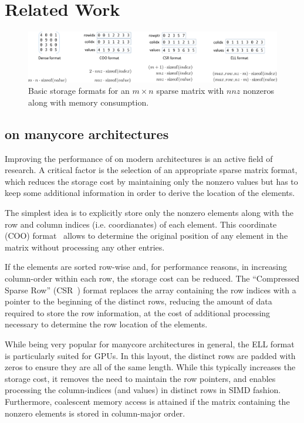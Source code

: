 \section{Related Work}
\label{2017-batched-spmv:sec:related}


\begin{figure}
\centering
\includegraphics[width=\columnwidth]{plots/formats}
\caption{Basic storage formats for an $m\times n$ sparse matrix with $nnz$
    nonzeros along with memory consumption.}
\label{2017-batched-spmv:fig:formatoverview}
\end{figure}

\subsection{\spmv on manycore architectures}

Improving the performance of \spmv on modern architectures is an active field of research. 
A critical factor is the selection of an appropriate
sparse matrix format, which reduces the storage cost by maintaining only the nonzero values
but has to keep some additional information in order to derive the location of the elements.

The simplest idea is to explicitly store only the nonzero elements
along with the row and column indices (i.e. coordianates) of each element.
This coordinate (COO)
format~\cite{barrettemplates} allows to determine the original position of any element
in the matrix without processing any other entries.

If the elements are sorted row-wise and, for performance reasons,
in increasing column-order within each row,
the storage cost can be reduced.
The ``Compressed Sparse Row'' (CSR~\cite{barrettemplates})
format
replaces the array containing the row indices with a pointer to the beginning 
of the distinct rows, reducing the amount of data required to store the row
information, at the cost of
additional processing necessary to determine the row location of the elements.

While being very
popular for manycore architectures in general, the ELL format~\cite{ellpack}
is particularly suited for GPUs.
In this layout, the distinct rows are padded with zeros to ensure
they are all of the same length.
While this typically increases the storage cost, 
it removes the need to maintain the row pointers,
and enables processing the column-indices (and values) in distinct
rows in SIMD fashion. Furthermore,
coalescent memory access is attained if the matrix containing
the nonzero elements
is stored in column-major order.

